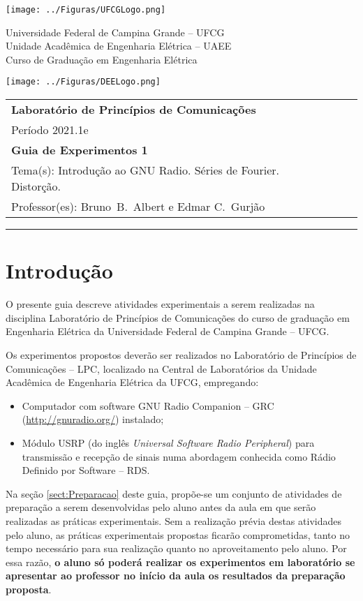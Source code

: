 \documentclass[12pt,addpoints]{exam}
\newcommand{\disciplina}{Laboratório de Princípios de Comunicações}
\newcommand{\periodo}{2021.1e}
\newcommand{\avaliacao}{Guia de Experimentos 1}
\newcommand{\tema}{Introdução ao GNU Radio. Séries de Fourier. Distorção.}
\newcommand{\professor}{Bruno\ B.\ Albert e Edmar C.\ Gurjão}
\begin{document}
\noindent \texttt{[image: ../Figuras/UFCGLogo.png]} \hfill
\begin{minipage}{.66\textwidth} \large \centering \vspace{-1.8cm}
    Universidade Federal de Campina Grande -- UFCG \\
    Unidade Acadêmica de Engenharia Elétrica -- UAEE \\
    Curso de Graduação em Engenharia Elétrica
\end{minipage}
\hfill \texttt{[image: ../Figuras/DEELogo.png]} \\[12pt]

\noindent
\begin{tabular*}{\textwidth}{lcr}
    \textbf{\disciplina} && \\
    Período \periodo && \\
    \textbf{\avaliacao} && \\
    Tema(s): \tema && \\
    Professor(es): \professor &&
\end{tabular*}
\noindent\rule[2ex]{\textwidth}{2pt}

\section{Introdução}

O presente guia descreve atividades experimentais a serem realizadas na disciplina Laboratório de Princípios de Comunicações do curso de graduação em Engenharia Elétrica da Universidade Federal de Campina Grande -- UFCG.

Os experimentos propostos deverão ser realizados no Laboratório de Princípios de Comunicações -- LPC, localizado na Central de Laboratórios da Unidade Acadêmica de Engenharia Elétrica da UFCG, empregando:
\begin{itemize}
    \item Computador com software GNU Radio Companion -- GRC (\url{http://gnuradio.org/}) instalado;
    \item Módulo USRP (do inglês \textit{Universal Software Radio Peripheral}) para transmissão e recepção de sinais numa abordagem conhecida como Rádio Definido por Software -- RDS.
\end{itemize}

Na seção \ref{sect:Preparacao} deste guia, propõe-se um conjunto de atividades de preparação a serem desenvolvidas pelo aluno antes da aula em que serão realizadas as práticas experimentais. Sem a realização prévia destas atividades pelo aluno, as práticas experimentais propostas ficarão comprometidas, tanto no tempo necessário para sua realização quanto no aproveitamento pelo aluno. Por essa razão, \textbf{o aluno só poderá realizar os experimentos em laboratório se apresentar ao professor no início da aula os resultados da preparação proposta}.
\end{document}
